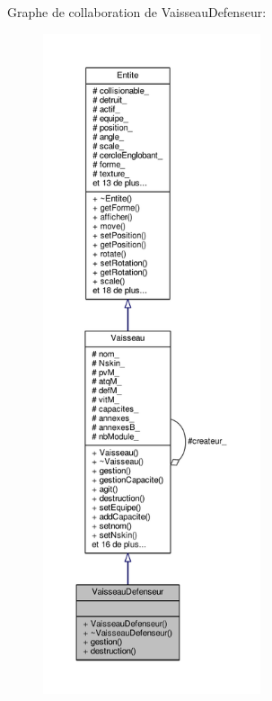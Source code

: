 Graphe de collaboration de Vaisseau\+Defenseur\+:\nopagebreak
\begin{figure}[H]
\begin{center}
\leavevmode
\includegraphics[height=550pt]{class_vaisseau_defenseur__coll__graph}
\end{center}
\end{figure}
